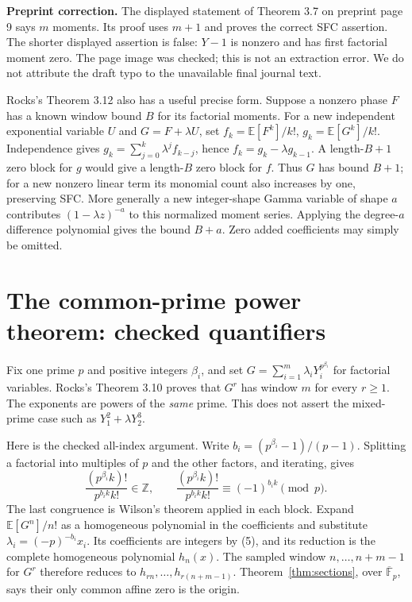 \documentclass[11pt]{article}
\begin{document}
\textbf{Preprint correction.} The displayed statement of Theorem 3.7 on
preprint page 9 says $m$ moments. Its proof uses $m+1$ and proves the
correct SFC assertion. The shorter displayed assertion is false: $Y-1$
is nonzero and has first factorial moment zero. The page image was checked;
this is not an extraction error. We do not attribute the draft typo to
the unavailable final journal text.

Rocks's Theorem 3.12 also has a useful precise form. Suppose a nonzero
phase $F$ has a known window bound $B$ for its factorial moments. For a
new independent exponential variable $U$ and $G=F+\lambda U$, set
$f_k=\mathbb E[F^k]/k!$, $g_k=\mathbb E[G^k]/k!$. Independence gives
$g_k=\sum_{j=0}^k\lambda^jf_{k-j}$, hence
$f_k=g_k-\lambda g_{k-1}$. A length-$B+1$ zero block for $g$ would give
a length-$B$ zero block for $f$. Thus $G$ has bound $B+1$; for a new
nonzero linear term its monomial count also increases by one, preserving
SFC. More generally a new integer-shape Gamma variable of shape $a$
contributes $(1-\lambda z)^{-a}$ to this normalized moment series.
Applying the degree-$a$ difference polynomial gives the bound $B+a$.
Zero added coefficients may simply be omitted.

\section{The common-prime power theorem: checked quantifiers}
Fix one prime $p$ and positive integers $\beta_i$, and set
$G=\sum_{i=1}^m\lambda_iY_i^{p^{\beta_i}}$ for factorial variables.
Rocks's Theorem 3.10 proves that $G^r$ has window $m$ for every $r\ge1$.
The exponents are powers of the \emph{same} prime. This does not assert
the mixed-prime case such as $Y_1^2+\lambda Y_2^3$.

Here is the checked all-index argument. Write
$b_i=(p^{\beta_i}-1)/(p-1)$. Splitting a factorial into multiples of $p$
and the other factors, and iterating, gives
\[
 \frac{(p^{\beta_i}k)!}{p^{b_i k}k!}\in\mathbb Z,
 \qquad
 \frac{(p^{\beta_i}k)!}{p^{b_i k}k!}
       \equiv(-1)^{b_i k}\pmod p.                  \tag{5}
\]
The last congruence is Wilson's theorem applied in each block. Expand
$\mathbb E[G^n]/n!$ as a homogeneous polynomial in the coefficients and
substitute $\lambda_i=(-p)^{-b_i}x_i$. Its coefficients are integers by
(5), and its reduction is the complete homogeneous polynomial $h_n(x)$.
The sampled window $n,\ldots,n+m-1$ for $G^r$ therefore reduces to
$h_{rn},\ldots,h_{r(n+m-1)}$. Theorem~\ref{thm:sections}, over
$\overline{\mathbb F}_p$, says their only common affine zero is the origin.
\end{document}
